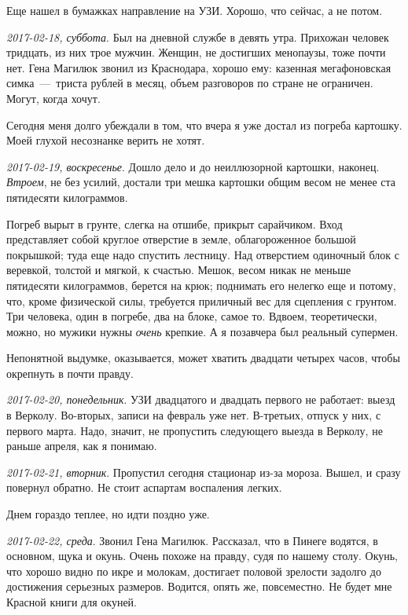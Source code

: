 \documentclass[
    12pt
    ,a4paper
    ,oneside
    ,russian
]{memoir}
\newcommand{\mydatestamp}{
    \bigskip   %
    \emph
}
\newcommand{\mds}{\mydatestamp}
\begin{document}
    Еще нашел в бумажках направление на УЗИ. Хорошо, что сейчас, а не потом.

    \mds{2017-02-18, суббота}. Был на дневной службе в девять утра. Прихожан человек тридцать, из них трое мужчин. Женщин, не достигших менопаузы, тоже почти нет. Гена Магилюк звонил из Краснодара, хорошо ему: казенная мегафоновская симка~---~триста рублей в месяц, объем разговоров по стране не ограничен. Могут, когда хочут.
    
    Сегодня меня долго убеждали в том, что вчера я уже достал из погреба картошку. Моей глухой несознанке верить не хотят.

    \mds{2017-02-19, воскресенье}. Дошло дело и до неиллюзорной картошки, наконец. \emph{Втроем}, не без усилий, достали три мешка картошки общим весом не менее ста пятидесяти килограммов.
    
    Погреб вырыт в грунте, слегка на отшибе, прикрыт сарайчиком. Вход представляет собой круглое отверстие в земле, облагороженное большой покрышкой; туда еще надо спустить лестницу. Над отверстием одиночный блок с веревкой, толстой и мягкой, к счастью. Мешок, весом никак не меньше пятидесяти килограммов, берется на крюк; поднимать его нелегко еще и потому, что, кроме физической силы, требуется приличный вес для сцепления с грунтом. Три человека, один в погребе, два на блоке, самое то. Вдвоем, теоретически, можно, но мужики нужны \emph{очень} крепкие. А я позавчера был реальный супермен.
    
    Непонятной выдумке, оказывается, может хватить двадцати четырех часов, чтобы окрепнуть в почти правду.

    \mds{2017-02-20, понедельник}. УЗИ двадцатого и двадцать первого не работает: выезд в Верколу. Во-вторых, записи на февраль уже нет. В-третьих, отпуск у них, с первого марта. Надо, значит, не пропустить следующего выезда в Верколу, не раньше апреля, как я понимаю.

    \mds{2017-02-21, вторник}. Пропустил сегодня стационар из-за мороза. Вышел, и сразу повернул обратно. Не стоит аспартам воспаления легких.
    
    Днем гораздо теплее, но идти поздно уже.

    \mds{2017-02-22, среда}. Звонил Гена Магилюк. Рассказал, что в Пинеге водятся, в основном, щука и окунь. Очень похоже на правду, судя по нашему столу. Окунь, что хорошо видно по икре и молокам, достигает половой зрелости задолго до достижения серьезных размеров. Водится, опять же, повсеместно. Не будет мне Красной книги для окуней.
    
\end{document}
